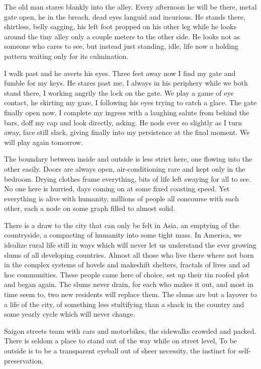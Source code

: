 \documentclass[ebook, 10pt, openright, onecolumn]{memoir}
\begin{document}
The old man stares blankly into the alley. Every afternoon he will be there,
metal gate open, he in the breach, dead eyes languid and incurious.  He stands
there, shirtless, belly sagging, his left foot propped on his other leg while he
looks around the tiny alley only a couple meters to the other side.  He looks
not as someone who cares to see, but instead just standing, idle, life now a
holding pattern waiting only for its culmination.

I walk past and he averts his eyes.  Three feet away now I find my gate and
fumble for my keys.  He stares past me, I always in his periphery while we both
stand there, I working angrily the lock on the gate.  We play a game of eye
contact, he skirting my gaze, I following his eyes trying to catch a glace.  The
gate finally open now, I complete my ingress with a laughing salute from behind the
bars, doff my cap and look directly, asking.  He nods ever so slightly as I turn
away, face still slack, giving finally into my persistence at the final
moment.  We will play again tomorrow. 

The boundary between inside and outside is less strict here, one flowing into
the other easily.  Doors are always open, air-conditioning rare and kept only in
the bedroom.  Drying clothes frame everything, bits of life left swaying for all
to see.  No one here is hurried, days coming on at some fixed coasting
speed. Yet everything is alive with humanity, millions of people all 
concourse with each other, each a node on some graph filled to almost solid.

There is a draw to the city that can only be felt in Asia, an emptying of the
countryside, a compacting of humanity into some tight mass.  In America, we
idealize rural life still in ways which will never let us understand the ever
growing slums of all developing countries.  Almost all those who live there
where not born in the complex systems of hovels and makeshift shelters, 
fractals of lives and ad hoc communities.  These people came here of choice, set
up their tin roofed plot and began again.  The slums never drain, for each who
makes it out, and most in time seem to, two new residents will replace them.
The slums are but a layover to a life of the city, of something less stultifying
than a shack in the country and some yearly cycle which will never change.

Saigon streets team with cars and motorbikes, the sidewalks crowded and packed.
There is seldom a place to stand out of the way while on street level, To be
outside is to be a transparent eyeball out of sheer necessity, the instinct for
self-preservation.
\end{document}
